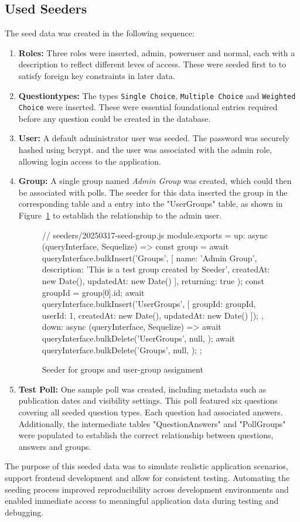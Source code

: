 \documentclass[a4paper,12pt]{report}
\begin{document}
\subsection{Used Seeders}
The seed data was created in the following sequence:
\begin{enumerate}
	\item \textbf{Roles:} Three roles were inserted, admin, poweruser and normal, each with a description to reflect different leves of access. These were seeded first to to satisfy foreign key constraints in later data.
	\item \textbf{Questiontypes:} The types \texttt{Single Choice}, \texttt{Multiple Choice} and \texttt{Weighted Choice} were inserted. These were essential foundational entries required before any question could be created in the database. 
	\item \textbf{User:} A default administrator user was seeded. The password was securely hashed using bcrypt. and the user was associated with the admin role, allowing login access to the application.
	\item \textbf{Group:} A single group named \textit{Admin Group} was created, which could then be associated with polls. The seeder for this data inserted the group in the corresponding table and a entry into the "UserGroups" table, as shown in Figure~\ref{fig:group_seeder} to establish the relationship to the admin user.
	\begin{figure}[H]
	\begin{code}
	// seeders/20250317-seed-group.js
	module.exports = {
	up: async (queryInterface, Sequelize) => {
		const group = await queryInterface.bulkInsert('Groups', [{
		name: 'Admin Group',
		description: 'This is a test group created by Seeder',
		createdAt: new Date(),
		updatedAt: new Date()
		}], { returning: true });
		const groupId = group[0].id;
		await queryInterface.bulkInsert('UserGroups', [{
		groupId: groupId,
		userId: 1,
		createdAt: new Date(),
		updatedAt: new Date()
		}]);
	},
	down: async (queryInterface, Sequelize) => {
		await queryInterface.bulkDelete('UserGroups', null, {});
		await queryInterface.bulkDelete('Groups', null, {});
	}
	};
	\end{code}
	\caption{Seeder for groups and user-group assignment}
	\label{fig:group_seeder}
	\end{figure}
	\item \textbf{Test Poll:} One sample poll was created, including metadata such as publication dates and visibility settings. This poll featured six questions covering all seeded question types. Each question had associated answers. Additionally, the intermediate tables "QuestionAnswers" and "PollGroups" were populated to establish the correct relationship between questions, answers and groups.
\end{enumerate}
The purpose of this seeded data was to simulate realistic application scenarios, support frontend development and allow for consistent testing. Automating the seeding process improved reproducibility across development environments and enabled immediate access to meaningful application data during testing and debugging. \\ \\
\end{document}

